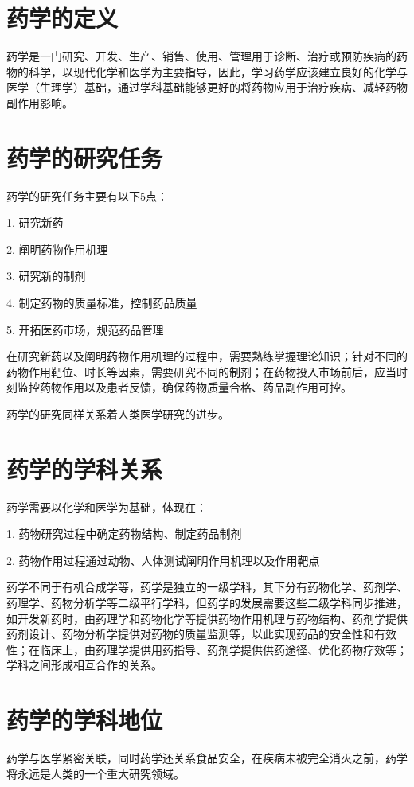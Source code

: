 \def\className{Medicine Outline}
\def\term{III-B}



\section{药学的定义}%
\label{sec:药学的定义}
药学是一门研究、开发、生产、销售、使用、管理用于诊断、治疗或预防疾病的药物的科学，以现代化学和医学为主要指导，因此，学习药学应该建立良好的化学与医学（生理学）基础，通过学科基础能够更好的将药物应用于治疗疾病、减轻药物副作用影响。
\section{药学的研究任务}%
\label{sec:药学的研究任务}
药学的研究任务主要有以下5点：

1. 研究新药

2. 阐明药物作用机理

3. 研究新的制剂

4. 制定药物的质量标准，控制药品质量

5. 开拓医药市场，规范药品管理

在研究新药以及阐明药物作用机理的过程中，需要熟练掌握理论知识；针对不同的药物作用靶位、时长等因素，需要研究不同的制剂；在药物投入市场前后，应当时刻监控药物作用以及患者反馈，确保药物质量合格、药品副作用可控。

药学的研究同样关系着人类医学研究的进步。
\section{药学的学科关系}%
\label{sec:药学的学科关系}
药学需要以化学和医学为基础，体现在：

1. 药物研究过程中确定药物结构、制定药品制剂

2. 药物作用过程通过动物、人体测试阐明作用机理以及作用靶点

药学不同于有机合成学等，药学是独立的一级学科，其下分有药物化学、药剂学、药理学、药物分析学等二级平行学科，但药学的发展需要这些二级学科同步推进，如开发新药时，由药理学和药物化学等提供药物作用机理与药物结构、药剂学提供药剂设计、药物分析学提供对药物的质量监测等，以此实现药品的安全性和有效性；在临床上，由药理学提供用药指导、药剂学提供供药途径、优化药物疗效等；学科之间形成相互合作的关系。
\section{药学的学科地位}%
\label{sec:药学的学科地位}
药学与医学紧密关联，同时药学还关系食品安全，在疾病未被完全消灭之前，药学将永远是人类的一个重大研究领域。

